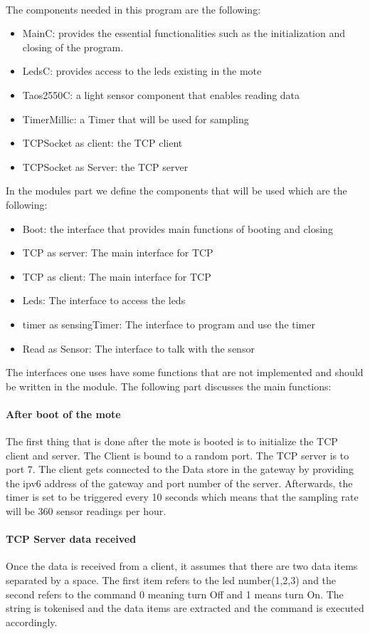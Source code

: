 \documentclass[12pt,a4paper,final]{report}
\begin{document}
\paragraph{}
The components needed in this program are the following:
\begin{itemize}
\item MainC: provides the essential functionalities such as the initialization and closing of the program.
\item LedsC: provides access to the leds existing in the mote
\item Taos2550C: a light sensor component that enables reading data
\item TimerMillic: a Timer that will be used for sampling
\item TCPSocket as client: the TCP client
\item TCPSocket as Server: the TCP server
\end{itemize}
In the modules part we define the components that will be used which are the following:
\begin{itemize}
\item Boot: the interface that provides main functions of booting and closing
\item TCP as server: The main interface for TCP
\item TCP as client: The main interface for TCP
\item Leds: The interface to access the leds
\item timer as sensingTimer: The interface to program and use the timer
\item Read as Sensor: The interface to talk with the sensor
\end{itemize}
The interfaces one uses have some functions that are not implemented and should be written in the module. The following part discusses the main functions:
\paragraph{After boot of the mote}
The first thing that is done after the mote is booted is to initialize the TCP client and server. The Client is bound to a random port. The TCP server is to port 7. The client gets connected to the Data store in the gateway by providing the \gls{ipv6} address of the gateway and port number of the server. Afterwards, the timer is set to be triggered every 10 seconds which means that the sampling rate will be 360 sensor readings per hour. 
\paragraph{TCP Server data received}
Once the data is received from a client, it assumes that there are two data items separated by a space. The first item refers to the led number(1,2,3) and the second refers to the command 0 meaning turn Off and 1 means turn On. The string is tokenised and the data items are extracted and the command is executed accordingly.
\end{document}
